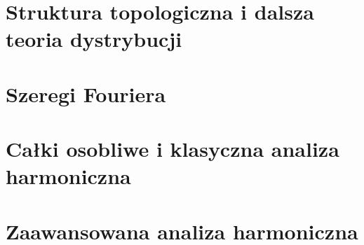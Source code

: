 \documentclass[11pt,a4paper]{article}
\numberwithin{equation}{section}
\theoremstyle{plain}
\theoremstyle{definition}
\theoremstyle{remark}
\begin{document}
\part{Struktura topologiczna i dalsza teoria dystrybucji}
\setcounter{section}{16}

\setcounter{section}{17}

\setcounter{section}{18}

\setcounter{section}{19}

\setcounter{section}{20}

\setcounter{part}{3}
\part{Szeregi Fouriera}
\setcounter{section}{23}

\setcounter{section}{25}

\setcounter{section}{26}

\setcounter{part}{6}
\part{Całki osobliwe i klasyczna analiza harmoniczna}
\setcounter{section}{40}

\setcounter{section}{41}

\setcounter{section}{42}

\setcounter{section}{45}

\setcounter{section}{49}

\setcounter{part}{7}
\part{Zaawansowana analiza harmoniczna}
\setcounter{section}{56}

\end{document}

